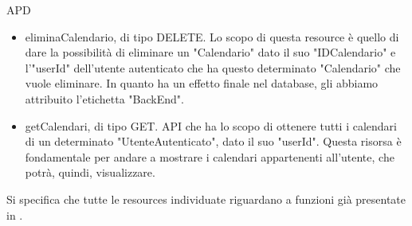 \begin{listaPersonale} {APD}
\begin{listaPersonale2}[APD]{}
\begin{itemize}
\begin{itemize}
                      \item eliminaCalendario, di tipo DELETE. Lo scopo di questa resource è quello di dare la possibilità di eliminare un "Calendario" dato il suo "IDCalendario" e l'"userId" dell'utente autenticato che ha questo determinato "Calendario" che vuole eliminare. In quanto ha un effetto finale nel database, gli abbiamo attribuito l'etichetta "BackEnd".
                      \item getCalendari, di tipo GET. API che ha lo scopo di ottenere tutti i calendari di un determinato "UtenteAutenticato", dato il suo "userId". Questa risorsa è fondamentale per andare a mostrare i calendari appartenenti all'utente, che potrà, quindi, visualizzare.
                  \end{itemize}
                  Si specifica che tutte le resources individuate riguardano a funzioni già presentate in .
        \end{itemize}

        \begin{center}
            
        \end{center}
        \newpage



\end{listaPersonale2}
\end{listaPersonale}
